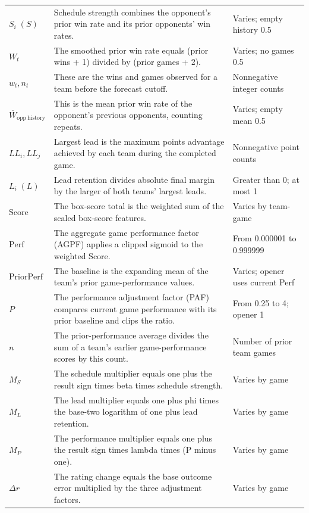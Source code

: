 \documentclass[11pt]{article}
\begin{document}
\begin{longtable}{@{}>{\raggedright\arraybackslash}p{}>{\raggedright\arraybackslash}p{}>{\raggedright\arraybackslash}p{}@{}}
$S_i\;(S)$ & Schedule strength combines the opponent's prior win rate and its prior opponents' win rates. & Varies; empty history 0.5\\
$W_t$ & The smoothed prior win rate equals (prior wins + 1) divided by (prior games + 2). & Varies; no games 0.5\\
$w_t,n_t$ & These are the wins and games observed for a team before the forecast cutoff. & Nonnegative integer counts\\
$\overline W_{\mathrm{opp\ history}}$ & This is the mean prior win rate of the opponent's previous opponents, counting repeats. & Varies; empty mean 0.5\\
$LL_i,LL_j$ & Largest lead is the maximum points advantage achieved by each team during the completed game. & Nonnegative point counts\\
$L_i\;(L)$ & Lead retention divides absolute final margin by the larger of both teams' largest leads. & Greater than 0; at most 1\\
$\mathrm{Score}$ & The box-score total is the weighted sum of the scaled box-score features. & Varies by team-game\\
$\mathrm{Perf}$ & The aggregate game performance factor (AGPF) applies a clipped sigmoid to the weighted Score. & From 0.000001 to 0.999999\\
$\mathrm{PriorPerf}$ & The baseline is the expanding mean of the team's prior game-performance values. & Varies; opener uses current Perf\\
$P$ & The performance adjustment factor (PAF) compares current game performance with its prior baseline and clips the ratio. & From 0.25 to 4; opener 1\\
$n$ & The prior-performance average divides the sum of a team's earlier game-performance scores by this count. & Number of prior team games\\
$M_S$ & The schedule multiplier equals one plus the result sign times beta times schedule strength. & Varies by game\\
$M_L$ & The lead multiplier equals one plus phi times the base-two logarithm of one plus lead retention. & Varies by game\\
$M_P$ & The performance multiplier equals one plus the result sign times lambda times (P minus one). & Varies by game\\
$\Delta r$ & The rating change equals the base outcome error multiplied by the three adjustment factors. & Varies by game\\
\end{longtable}
\clearpage
\end{document}
